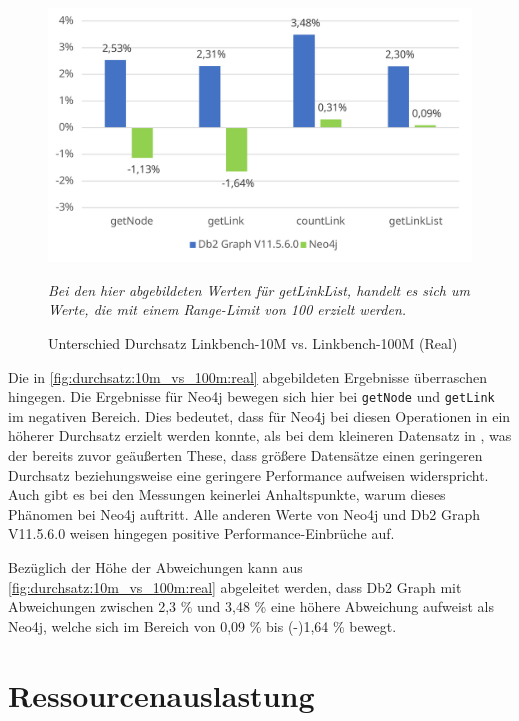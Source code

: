 \begin{figure}[!ht]
    \centering
    \includegraphics[width=\textwidth]{images/diagramme/difference_durchsatz_real_10m_vs_100m.pdf}
    \caption{Unterschied Durchsatz Linkbench-10M vs. Linkbench-100M (Real)}
    \label{fig:durchsatz:10m_vs_100m:real}
    \vspace{1em}
    \textit{Bei den hier abgebildeten Werten für getLinkList, handelt es sich um Werte, die mit einem Range-Limit von 100 erzielt werden.}
\end{figure}

Die in \autoref{fig:durchsatz:10m_vs_100m:real} abgebildeten Ergebnisse überraschen hingegen. Die Ergebnisse für Neo4j bewegen sich hier bei \texttt{getNode} und \texttt{getLink} im negativen Bereich. Dies bedeutet, dass für Neo4j bei diesen Operationen in  ein höherer Durchsatz erzielt werden konnte, als bei dem kleineren Datensatz in , was der bereits zuvor geäußerten These, dass größere Datensätze einen geringeren Durchsatz beziehungsweise eine geringere Performance aufweisen widerspricht. Auch gibt es bei den Messungen keinerlei Anhaltspunkte, warum dieses Phänomen bei Neo4j auftritt. Alle anderen Werte von Neo4j und Db2 Graph V11.5.6.0 weisen hingegen positive Performance-Einbrüche auf.

Bezüglich der Höhe der Abweichungen kann aus \autoref{fig:durchsatz:10m_vs_100m:real} abgeleitet werden, dass Db2 Graph mit Abweichungen zwischen 2,3 \% und 3,48 \% eine höhere Abweichung aufweist als Neo4j, welche sich im Bereich von 0,09 \% bis (-)1,64 \% bewegt. 

\section{Ressourcenauslastung}
\label{auswertung:ressourcenauslastung}

